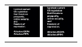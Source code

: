 \documentclass{acm_proc_article-sp}
\newcommand{\thumbheight}{14mm}
\newenvironment{thumbsequence}{}{\makebox[4mm]{}}
\begin{document}
\begin{figure}
\begin{tabular}{p{\textwidth}}
\begin{thumbsequence}
		\includegraphics[height=\thumbheight]{resources/sopa/looseduplicate3.jpg}
		\includegraphics[height=\thumbheight]{resources/sopa/looseduplicate4.jpg}

\end{thumbsequence}
\end{tabular}
\end{figure}
\end{document}
